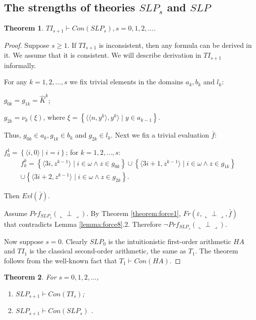 \documentclass{asl}
\newtheorem{theorem}{Theorem}[section]
\theoremstyle{definition}
\begin{document}
\subsection{The strengths of theories $SLP_s$ and $SLP$}
\begin{theorem}
$TI_{s+1}\vdash Con(SLP_s), s=0,1,2,\ldots$.
\label{theorem:force2}
\end{theorem}
\begin{proof}
Suppose $s\geqslant 1$. If $TI_{s+1}$ is inconsistent, then any formula can be derived in it. We assume that it is consistent. We will describe derivation in $TI_{s+1}$ informally. 

For any $k=1,2,\ldots,s$ we fix trivial elements in the domains $a_k,b_k$ and $l_k$:
\begin{list}{â¢}{â¢}
\item $g_{0k}=g_{1k}=\hat{K}^k$;
\smallskip
\item $g_{2k}=\nu_k(\xi)$, where $\xi=\left\lbrace\langle\langle n,y^k
\rangle,y^k\rangle \mid y\in a_{k-1}\right\rbrace$. 
\end{list}

Thus, $g_{0k}\in a_k,g_{1k}\in b_k$ and $g_{2k}\in l_k$. Next we fix a trivial evaluation $\bar{f}$:
\smallskip

$f_0^1=\left\lbrace \langle i,0\rangle\mid i=i
\right\rbrace$; for $k=1,2,\ldots,s$:
\begin{multline*}
f_k^k=\left\lbrace \langle 3i,z^{k-1}\rangle\mid i\in\omega\wedge z\in g_{0k}\right\rbrace\cup
\left\lbrace \langle 3i+1,z^{k-1}\rangle\mid i\in\omega \wedge z\in g_{1k}\right\rbrace
\\
\cup
\left\lbrace \langle 3i+2,z^{k-1}\rangle\mid i\in\omega\wedge z\in g_{2k}\right\rbrace.
\end{multline*}

Then $Evl(\bar{f})$.

Assume $Prf_{SLP_s}(\llcorner \perp \lrcorner)$. By Theorem \ref{theorem:force1}, $Fr(\varepsilon,\llcorner \perp \lrcorner,\bar{f}) $ that contradicts Lemma \ref{lemma:force8}.2. Therefore $\neg Prf_{SLP_s}(\llcorner \perp \lrcorner)$.

Now suppose $s=0$. Clearly $SLP_0$ is the intuitionistic first-order arithmetic $HA$ and $TI_1$ is the classical second-order arithmetic, the same as $T_1$. The theorem follows from the well-known fact that $T_1\vdash Con(HA)$.
\end{proof}

\begin{theorem}
For $s=0,1,2,\ldots$,
\begin{enumerate}
\item $SLP_{s+1}\vdash Con(TI_s)$; 
\item $SLP_{s+1}\vdash Con(SLP_s)$ .
\end{enumerate}
\label{theorem:con4}
\end{theorem}
\end{document}
